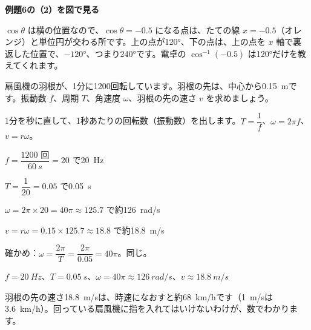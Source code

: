 \noindent\begin{minipage}[c]{0.36\linewidth}
\centering
{}
\end{minipage}\hfill
\begin{minipage}[c]{0.6\linewidth}
\raggedright
\textbf{例題6の（2）を図で見る}\par
$\cos\theta$ は横の位置なので、$\cos\theta=-0.5$ になる点は、たての線 $x=-0.5$（オレンジ）と単位円が交わる所です。上の点が120°、下の点は、上の点を $x$ 軸で裏返した位置で、$-120°$、つまり240°です。電卓の $\cos^{-1}(-0.5)$ は120°だけを教えてくれます。
\end{minipage}

\begin{reidai}
扇風機の羽根が、1分に1200回転しています。羽根の先は、中心から\qty{0.15}{m}です。振動数 $f$、周期 $T$、角速度 $\omega$、羽根の先の速さ $v$ を求めましょう。\par
\kangaekata 1分を秒に直して、1秒あたりの回転数（振動数）を出します。$T=\dfrac{1}{f}$、$\omega=2\pi f$、$v=r\omega$。\par
\shiki{}\zw{} $f=\dfrac{1200\text{ 回}}{\qty{60}{s}}=20$ で\qty{20}{Hz}\par
\bkivia $T=\dfrac{1}{20}=0.05$ で\qty{0.05}{s}\par
\bkivia $\omega=2\pi\times20=40\pi\approx125.7$ で約\qty{126}{rad/s}\par
\bkivia $v=r\omega=0.15\times125.7\approx18.8$ で約\qty{18.8}{m/s}\par
\bkivia 確かめ：$\omega=\dfrac{2\pi}{T}=\dfrac{2\pi}{0.05}=40\pi$。同じ。\par
\kotae{}\zw{} $f=\qty{20}{Hz}$、$T=\qty{0.05}{s}$、$\omega=40\pi\approx\qty{126}{rad/s}$、$v\approx\qty{18.8}{m/s}$
\end{reidai}
羽根の先の速さ\qty{18.8}{m/s}は、時速になおすと約\qty{68}{km/h}です（\qty{1}{m/s}は\qty{3.6}{km/h}）。回っている扇風機に指を入れてはいけないわけが、数でわかります。



